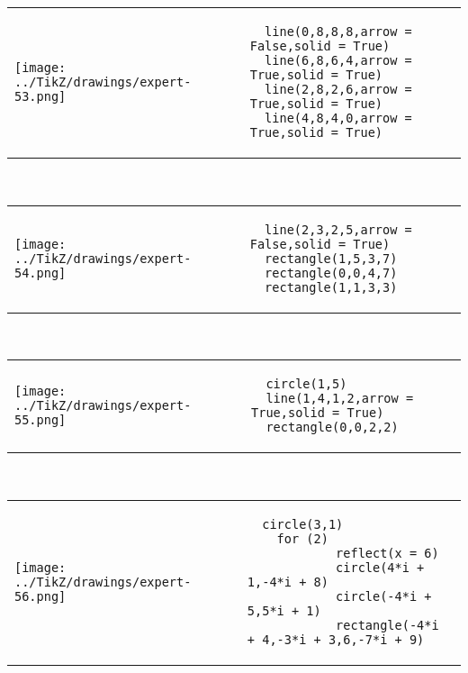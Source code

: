             \begin{tabular}{ll}
    \texttt{[image: ../TikZ/drawings/expert-53.png]}&
    
        \begin{minipage}{10cm}
        \begin{verbatim}
  line(0,8,8,8,arrow = False,solid = True)
  line(6,8,6,4,arrow = True,solid = True)
  line(2,8,2,6,arrow = True,solid = True)
  line(4,8,4,0,arrow = True,solid = True)
        \end{verbatim}
\end{minipage}

    \end{tabular}        
            \\

            \begin{tabular}{ll}
    \texttt{[image: ../TikZ/drawings/expert-54.png]}&
    
        \begin{minipage}{10cm}
        \begin{verbatim}
  line(2,3,2,5,arrow = False,solid = True)
  rectangle(1,5,3,7)
  rectangle(0,0,4,7)
  rectangle(1,1,3,3)
        \end{verbatim}
\end{minipage}

    \end{tabular}        
            \\

            \begin{tabular}{ll}
    \texttt{[image: ../TikZ/drawings/expert-55.png]}&
    
        \begin{minipage}{10cm}
        \begin{verbatim}
  circle(1,5)
  line(1,4,1,2,arrow = True,solid = True)
  rectangle(0,0,2,2)
        \end{verbatim}
\end{minipage}

    \end{tabular}        
            \\

            \begin{tabular}{ll}
    \texttt{[image: ../TikZ/drawings/expert-56.png]}&
    
        \begin{minipage}{10cm}
        \begin{verbatim}
  circle(3,1)
    for (2)
            reflect(x = 6)
            circle(4*i + 1,-4*i + 8)
            circle(-4*i + 5,5*i + 1)
            rectangle(-4*i + 4,-3*i + 3,6,-7*i + 9)
        \end{verbatim}
\end{minipage}

    \end{tabular}        
            \\

